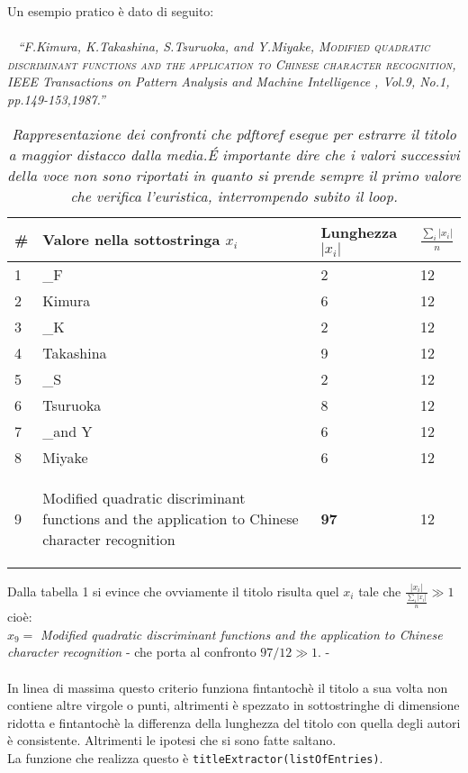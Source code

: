 Un esempio pratico è dato di seguito:\\
\\~
\textit{``F.Kimura, K.Takashina, S.Tsuruoka, and Y.Miyake, \textsc{Modified quadratic discriminant functions and the application to Chinese character recognition}, IEEE Transactions on Pattern Analysis and Machine Intelligence , Vol.9, No.1, pp.149-153,1987.'' }
\\
\begin{table}\label{tab:title}
\begin{center}
\begin{tabular}[b]{|l|l|l|l|} \hline
	\#  & Valore nella sottostringa $x_i$ & Lunghezza $|x_i|$ & $  \frac{\sum_i |x_i|}{n}$  \\ \hline
	1 & \_F & 2 & 12 \\  
	2 & Kimura & 6 & 12 \\ 
	3 & \_K & 2 & 12 \\ 
	4 & Takashina & 9 & 12 \\
	5 & \_S & 2 & 12 \\
	6 & Tsuruoka & 8 & 12 \\
	7 & \_and Y & 6 & 12 \\
	8 & Miyake & 6 & 12 \\ 
	9 & \begin{scriptsize}Modified quadratic discriminant functions and the  application to Chinese character recognition\end{scriptsize} & \textbf{97} & 12 \\ \hline
\end{tabular}

\tiny{\caption{\textit{Rappresentazione dei confronti che pdftoref esegue per estrarre il titolo a maggior distacco dalla media.\'E importante dire che i valori successivi della voce non sono riportati in quanto si prende sempre il primo valore che verifica l'euristica, interrompendo subito il loop.}}}

\label{label}
\end{center}
\end{table}

Dalla tabella 1 si evince che ovviamente il titolo risulta quel $x_i$ tale che $ \frac{|x_i|}{ \frac{\sum_i |x_i|}{n}} \gg 1 $ cioè:
\\ $ x_9= $ \textit{Modified quadratic discriminant functions and the application to Chinese character recognition} - che porta al confronto $97/12 \gg 1$. -
\\~\\
In linea di massima questo criterio funziona fintantochè il titolo a sua volta non contiene altre virgole o punti, altrimenti è spezzato in sottostringhe di dimensione ridotta e fintantochè la differenza della lunghezza del titolo con quella degli autori è consistente. Altrimenti le ipotesi che si sono fatte saltano. \\ La funzione che realizza questo è \texttt{titleExtractor(listOfEntries)}.


